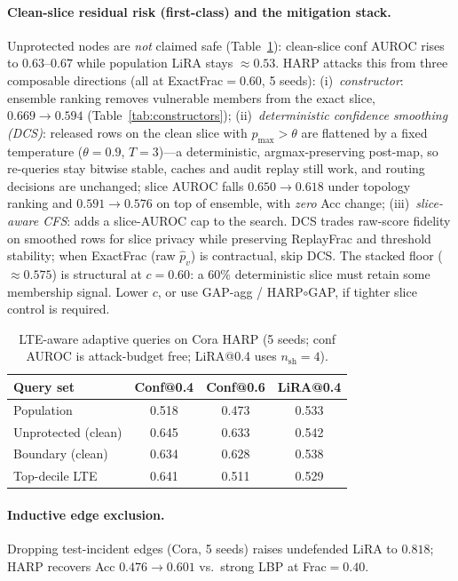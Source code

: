 \documentclass[conference]{IEEEtran}
\begin{document}
\paragraph{Clean-slice residual risk (first-class) and the mitigation stack.}
\label{sec:adaptive}
Unprotected nodes are \emph{not} claimed safe (Table~\ref{tab:adaptive}): clean-slice conf AUROC rises to $0.63$--$0.67$ while population LiRA stays ${\approx}0.53$.
HARP attacks this from three composable directions (all at ExactFrac${=}0.60$, 5 seeds):
(i)~\emph{constructor}: ensemble ranking removes vulnerable members from the exact slice, $0.669\rightarrow 0.594$ (Table~\ref{tab:constructors});
(ii)~\emph{deterministic confidence smoothing (DCS)}: released rows on the clean slice with $p_{\max}{>}\theta$ are flattened by a fixed temperature ($\theta{=}0.9$, $T{=}3$)---a deterministic, argmax-preserving post-map, so re-queries stay bitwise stable, caches and audit replay still work, and routing decisions are unchanged; slice AUROC falls $0.650\rightarrow 0.618$ under topology ranking and $0.591\rightarrow 0.576$ on top of ensemble, with \emph{zero} Acc change;
(iii)~\emph{slice-aware CFS}: adds a slice-AUROC cap to the search.
DCS trades raw-score fidelity on smoothed rows for slice privacy while preserving ReplayFrac and threshold stability; when ExactFrac (raw $\hat p_v$) is contractual, skip DCS.
The stacked floor (${\approx}0.575$) is structural at $c{=}0.60$: a $60\%$ deterministic slice must retain some membership signal.
Lower $c$, or use GAP-agg / HARP$\circ$GAP, if tighter slice control is required.

\begin{table}[!t]
\caption{LTE-aware adaptive queries on Cora HARP (5 seeds; conf AUROC is attack-budget free; LiRA@0.4 uses $n_{\mathrm{sh}}{=}4$).}
\label{tab:adaptive}
\centering
\scriptsize
\begin{tabular}{@{}lccc@{}}
\toprule
\textbf{Query set} & \textbf{Conf@0.4} & \textbf{Conf@0.6} & \textbf{LiRA@0.4} \\
\midrule
Population & 0.518 & 0.473 & 0.533 \\
Unprotected (clean) & 0.645 & 0.633 & 0.542 \\
Boundary (clean) & 0.634 & 0.628 & 0.538 \\
Top-decile LTE & 0.641 & 0.511 & 0.529 \\
\bottomrule
\end{tabular}
\end{table}

\paragraph{Inductive edge exclusion.}
\label{sec:inductive}
Dropping test-incident edges (Cora, 5 seeds) raises undefended LiRA to $0.818$; HARP recovers Acc $0.476\rightarrow 0.601$ vs.\ strong LBP at Frac${=}0.40$.
\end{document}
